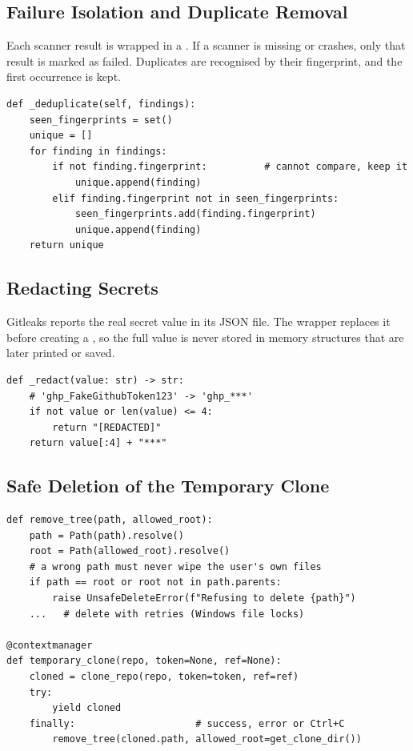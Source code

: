 \documentclass[12pt,a4paper]{article}
\newcommand{\code}[1]{\texttt{\detokenize{#1}}}
\begin{document}
\subsection{Failure Isolation and Duplicate Removal}

Each scanner result is wrapped in a \code{ScannerResult}. If a scanner is missing or crashes, only that result is marked as failed. Duplicates are recognised by their fingerprint, and the first occurrence is kept.

\begin{lstlisting}[caption={Duplicate removal by fingerprint (simplified)},label={lst:dedup}]
def _deduplicate(self, findings):
    seen_fingerprints = set()
    unique = []
    for finding in findings:
        if not finding.fingerprint:          # cannot compare, keep it
            unique.append(finding)
        elif finding.fingerprint not in seen_fingerprints:
            seen_fingerprints.add(finding.fingerprint)
            unique.append(finding)
    return unique
\end{lstlisting}

\subsection{Redacting Secrets}

Gitleaks reports the real secret value in its JSON file. The wrapper replaces it before creating a \code{Finding}, so the full value is never stored in memory structures that are later printed or saved.

\begin{lstlisting}[caption={Secret redaction (scanners/gitleaks\_scanner.py)},label={lst:redact}]
def _redact(value: str) -> str:
    # 'ghp_FakeGithubToken123' -> 'ghp_***'
    if not value or len(value) <= 4:
        return "[REDACTED]"
    return value[:4] + "***"
\end{lstlisting}

\subsection{Safe Deletion of the Temporary Clone}

\begin{lstlisting}[caption={Guard against deleting the wrong folder (github\_integration/cleanup.py)},label={lst:delete}]
def remove_tree(path, allowed_root):
    path = Path(path).resolve()
    root = Path(allowed_root).resolve()
    # a wrong path must never wipe the user's own files
    if path == root or root not in path.parents:
        raise UnsafeDeleteError(f"Refusing to delete {path}")
    ...   # delete with retries (Windows file locks)

@contextmanager
def temporary_clone(repo, token=None, ref=None):
    cloned = clone_repo(repo, token=token, ref=ref)
    try:
        yield cloned
    finally:                     # success, error or Ctrl+C
        remove_tree(cloned.path, allowed_root=get_clone_dir())
\end{lstlisting}
\end{document}
